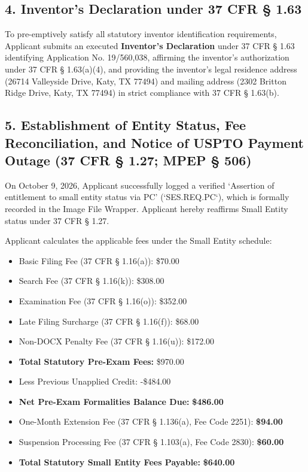 \documentclass[11pt,letterpaper]{article}
\begin{document}
\subsection*{4. Inventor's Declaration under 37 CFR \S{} 1.63}

To pre-emptively satisfy all statutory inventor identification requirements, Applicant submits an executed \textbf{Inventor's Declaration} under 37 CFR \S{} 1.63 identifying Application No. 19/560,038, affirming the inventor's authorization under 37 CFR \S{} 1.63(a)(4), and providing the inventor's legal residence address (26714 Valleyside Drive, Katy, TX 77494) and mailing address (2302 Britton Ridge Drive, Katy, TX 77494) in strict compliance with 37 CFR \S{} 1.63(b).

\subsection*{5. Establishment of Entity Status, Fee Reconciliation, and Notice of USPTO Payment Outage (37 CFR \S{} 1.27; MPEP \S{} 506)}

On October 9, 2026, Applicant successfully logged a verified `Assertion of entitlement to small entity status via PC' (`SES.REQ.PC`), which is formally recorded in the Image File Wrapper. Applicant hereby reaffirms Small Entity status under 37 CFR \S{} 1.27.

Applicant calculates the applicable fees under the Small Entity schedule:
\begin{itemize}[leftmargin=2em, itemsep=2pt, parsep=0pt]
    \item Basic Filing Fee (37 CFR \S{} 1.16(a)): \$70.00
    \item Search Fee (37 CFR \S{} 1.16(k)): \$308.00
    \item Examination Fee (37 CFR \S{} 1.16(o)): \$352.00
    \item Late Filing Surcharge (37 CFR \S{} 1.16(f)): \$68.00
    \item Non-DOCX Penalty Fee (37 CFR \S{} 1.16(u)): \$172.00
    \item \textbf{Total Statutory Pre-Exam Fees:} \$970.00
    \item Less Previous Unapplied Credit: -\$484.00
    \item \textbf{Net Pre-Exam Formalities Balance Due:} \textbf{\$486.00}
    \item One-Month Extension Fee (37 CFR \S{} 1.136(a), Fee Code 2251): \textbf{\$94.00}
    \item Suspension Processing Fee (37 CFR \S{} 1.103(a), Fee Code 2830): \textbf{\$60.00}
    \item \textbf{Total Statutory Small Entity Fees Payable:} \textbf{\$640.00}
\end{itemize}
\end{document}
